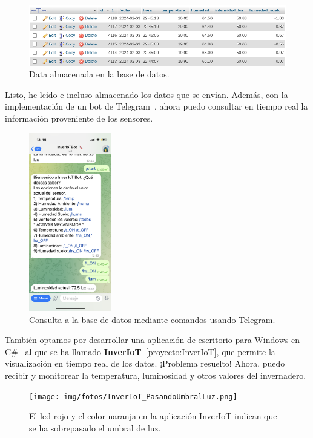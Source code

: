 \begin{figure}[h]
	\centering
	\includegraphics[width=1\textwidth]{img/desarrollo/mysql_data.png}
	\caption{Data almacenada en la base de datos.}
\end{figure}

Listo, he leído e incluso almacenado los datos que se envían. Además, con la implementación de un bot de Telegram~\cite{misc:Telegram}, ahora puedo consultar en tiempo real la información proveniente de los sensores.

\begin{figure}[h]
	\centering
	\includegraphics[width=0.32\textwidth]{img/desarrollo/BotTelegram_comandos.png}
	\caption{Consulta a la base de datos mediante comandos usando Telegram.}
\end{figure}

También optamos por desarrollar una aplicación de escritorio para Windows en C\#~\cite{manual:CSharp} al que se ha llamado \textbf{InverIoT}~\ref{proyecto:InverIoT}, que permite la visualización en tiempo real de los datos. ¡Problema resuelto! Ahora, puedo recibir y monitorear la temperatura, luminosidad y otros valores del invernadero.

\begin{figure}[h]
	\centering
	\texttt{[image: img/fotos/InverIoT\_PasandoUmbralLuz.png]}
	\caption{El led rojo y el color naranja en la aplicación InverIoT indican que se ha sobrepasado el umbral de luz.}
\end{figure}

